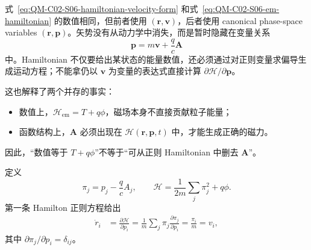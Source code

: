 式~\eqref{eq:QM-C02-S06-hamiltonian-velocity-form} 和式~\eqref{eq:QM-C02-S06-em-hamiltonian} 的数值相同，但前者使用 $(\bm r,\bm v)$，后者使用 canonical phase-space variables $(\bm r,\bm p)$。矢势没有从动力学中消失，而是暂时隐藏在变量关系
\[
  \bm p=m\bm v+\frac qc\bm A
\]
中。Hamiltonian 不仅要给出某状态的能量数值，还必须通过对正则变量求偏导生成运动方程；不能拿仍以 $\bm v$ 为变量的表达式直接计算 $\partial\mathcal H/\partial\bm p$。

这也解释了两个并存的事实：
\begin{itemize}[leftmargin=*]
  \item 数值上，$\mathcal H_{\mathrm{em}}=T+q\phi$，磁场本身不直接贡献粒子能量；
  \item 函数结构上，$\bm A$ 必须出现在 $\mathcal H(\bm r,\bm p,t)$ 中，才能生成正确的磁力。
\end{itemize}
因此，“数值等于 $T+q\phi$”不等于“可从正则 Hamiltonian 中删去 $\bm A$”。


定义
\[
  \pi_j=p_j-\frac qcA_j,
  \qquad
  \mathcal H
  =\frac1{2m}\sum_j\pi_j^2+q\phi.
\]
第一条 Hamilton 正则方程给出
\begin{align}
  \dot r_i
  &=\frac{\partial\mathcal H}{\partial p_i}
    =\frac1m\sum_j
      \pi_j\frac{\partial\pi_j}{\partial p_i}
    =\frac{\pi_i}{m}=v_i,
  \label{eq:QM-C02-S06-first-hamilton-equation}
\end{align}
其中 $\partial\pi_j/\partial p_i=\delta_{ij}$。

